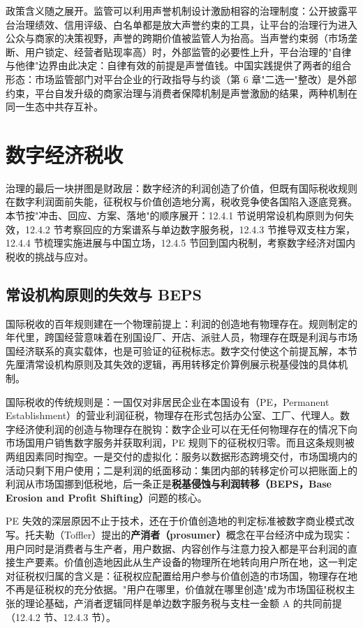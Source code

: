 政策含义随之展开。监管可以利用声誉机制设计激励相容的治理制度：公开披露平台治理绩效、信用评级、白名单都是放大声誉约束的工具，让平台的治理行为进入公众与商家的决策视野，声誉的跨期价值被监管人为抬高。当声誉约束弱（市场垄断、用户锁定、经营者贴现率高）时，外部监管的必要性上升，平台治理的"自律与他律"边界由此决定：自律有效的前提是声誉值钱。中国实践提供了两者的组合形态：市场监管部门对平台企业的行政指导与约谈（第 6 章"二选一"整改）是外部约束，平台自发升级的商家治理与消费者保障机制是声誉激励的结果，两种机制在同一生态中共存互补。

\section{数字经济税收}

治理的最后一块拼图是财政层：数字经济的利润创造了价值，但既有国际税收规则在数字利润面前失能，征税权与价值创造地分离，税收竞争使各国陷入逐底竞赛。本节按"冲击、回应、方案、落地"的顺序展开：12.4.1 节说明常设机构原则为何失效，12.4.2 节考察回应的方案谱系与单边数字服务税，12.4.3 节推导双支柱方案，12.4.4 节梳理实施进展与中国立场，12.4.5 节回到国内税制，考察数字经济对国内税收的挑战与应对。

\subsection{常设机构原则的失效与 BEPS}

国际税收的百年规则建在一个物理前提上：利润的创造地有物理存在。规则制定的年代里，跨国经营意味着在别国设厂、开店、派驻人员，物理存在既是利润与市场国经济联系的真实载体，也是可验证的征税标志。数字交付使这个前提瓦解，本节先厘清常设机构原则及其失效的逻辑，再用转移定价算例展示税基侵蚀的具体机制。

国际税收的传统规则是：一国仅对非居民企业在本国设有（PE，Permanent Establishment）的营业利润征税，物理存在形式包括办公室、工厂、代理人。数字经济使利润的创造与物理存在脱钩：数字企业可以在无任何物理存在的情况下向市场国用户销售数字服务并获取利润，PE 规则下的征税权归零。而且这条规则被两组因素同时掏空。一是交付的虚拟化：服务以数据形态跨境交付，市场国境内的活动只剩下用户使用；二是利润的纸面移动：集团内部的转移定价可以把账面上的利润从市场国挪到低税地，后一条正是\textbf{税基侵蚀与利润转移（BEPS，Base Erosion and Profit Shifting）}问题的核心。

PE 失效的深层原因不止于技术，还在于价值创造地的判定标准被数字商业模式改写。托夫勒（Toffler）提出的\textbf{产消者（prosumer）}概念在平台经济中成为现实：用户同时是消费者与生产者，用户数据、内容创作与注意力投入都是平台利润的直接生产要素。价值创造地因此从生产设备的物理所在地转向用户所在地，这一判定对征税权归属的含义是：征税权应配置给用户参与价值创造的市场国，物理存在地不再是征税权的充分依据。"用户在哪里，价值就在哪里创造"成为市场国征税权主张的理论基础，产消者逻辑同样是单边数字服务税与支柱一金额 A 的共同前提（12.4.2 节、12.4.3 节）。

